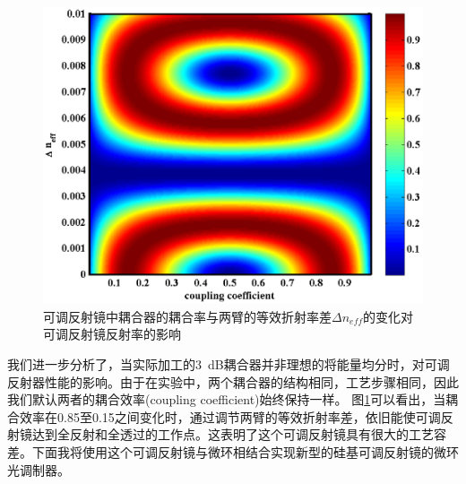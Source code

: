 \begin{figure}[htb]
	\centering
	\includegraphics[width=15cm]{./Pictures/chapt5_grating_ring_real_3dB.eps}
	\caption{可调反射镜中耦合器的耦合率与两臂的等效折射率差$\Delta n_{eff}$的变化对可调反射镜反射率的影响}
	\label{chapt5_grating_ring_real_3dB}
\end{figure}
我们进一步分析了，当实际加工的3~dB耦合器并非理想的将能量均分时，对可调反射器性能的影响。由于在实验中，两个耦合器的结构相同，工艺步骤相同，因此我们默认两者的耦合效率(coupling coefficient)始终保持一样。 图\ref{chapt5_grating_ring_real_3dB}可以看出，当耦合效率在0.85至0.15之间变化时，通过调节两臂的等效折射率差，依旧能使可调反射镜达到全反射和全透过的工作点。这表明了这个可调反射镜具有很大的工艺容差。下面我将使用这个可调反射镜与微环相结合实现新型的硅基可调反射镜的微环光调制器。

